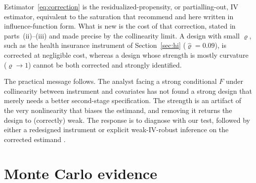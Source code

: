 \documentclass[preprint,11pt,authoryear]{elsarticle}
\theoremstyle{definition}
\begin{document}
Estimator~\eqref{eq:correction} is the residualized-propensity, or partialling-out, IV
estimator, equivalent to the saturation that \citet{blandhol2022} recommend and here
written in influence-function form. What is new is the cost of that correction, stated in
parts~(ii)--(iii) and made precise by the collinearity limit. A design with small $\varrho$, such as the health insurance
instrument of Section~\ref{sec:hi} ($\hat\varrho=0.09$), is corrected at negligible cost,
whereas a design whose strength is mostly curvature ($\varrho\to1$) cannot be both
corrected and strongly identified.

The practical message follows. The analyst
facing a strong conditional $F$ under collinearity between instrument and covariates has not
found a strong design that merely needs a better second-stage specification. The
strength is an artifact of the very nonlinearity that biases the estimand, and
removing it returns the design to (correctly) weak. The response is to diagnose
with our test, followed by either a redesigned instrument or explicit
weak-IV-robust inference on the corrected estimand
\citep{andrews2019,montielolea2013}.

\section{Monte Carlo evidence}\label{sec:mc}
\end{document}
